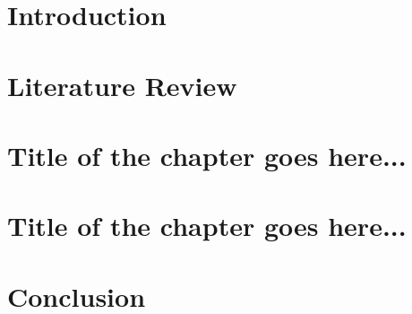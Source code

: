 \documentclass[11pt]{book}
\begin{document}
\mastersthesis

\chapter{Introduction}
\label{ch:intro}

\chapter{Literature Review}
\label{ch:lit_review}


\chapter{Title of the chapter goes here...}
\label{ch:ch1}


\chapter{Title of the chapter goes here...}
\label{ch:ch2}


\chapter{Conclusion}
\label{ch:conc}
% 


\printbibliography %
\end{document}

